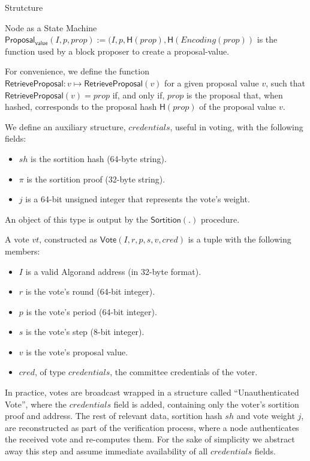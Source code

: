 \documentclass[10pt,a4paper]{article}
\begin{document}
\begin{section}{Strutcture}
\begin{subsection}{Node as a State Machine}
$\mathsf{Proposal_{value}}(I, p, prop) := (I, p, \mathsf{H}(prop), \mathsf{H}(Encoding(prop))$ is the function used
by a block proposer to create a proposal-value.

For convenience, we define the function $\mathsf{RetrieveProposal}:v\mapsto{\mathsf{RetrieveProposal}}(v)$ for a given proposal value 
$v$,  such that $\mathsf{RetrieveProposal}(v) = prop$ if, and only if, $prop$ is the proposal that, when hashed, corresponds 
to the proposal hash $\mathsf{H}(prop)$ of the proposal value $v$.

We define an auxiliary structure, $credentials$, useful in voting, with the following fields:
\begin{itemize}
    \item $sh$ is the sortition hash (64-byte string).
    \item $\pi$ is the sortition proof (32-byte string).
    \item $j$ is a 64-bit unsigned integer that represents the vote's weight.
\end{itemize}
An object of this type is output by the $\mathsf{Sortition}(.)$ procedure.

A vote $vt$, constructed as $\mathsf{Vote}(I,r,p,s,v,cred)$ is a tuple with the following members:
\begin{itemize}
    \item $I$ is a valid Algorand address (in 32-byte format).
    \item $r$ is the vote's round (64-bit integer).
    \item $p$ is the vote's period (64-bit integer).
    \item $s$ is the vote's step (8-bit integer).
    \item $v$ is the vote's proposal value.
    \item $cred$, of type $credentials$, the committee credentials of the voter.
\end{itemize}

In practice, votes are broadcast wrapped in a structure called ``Unauthenticated Vote'', 
where the $credentials$ field is added, containing only the voter's sortition proof and 
address.
The rest of relevant data, sortition hash $sh$ and vote weight $j$, are reconstructed as part 
of the verification process, 
where a node authenticates the received vote and re-computes them.
For the sake of simplicity we abstract away this step and assume immediate availability of all 
$credentials$ fields.



\end{subsection}
\end{section}
\end{document}
